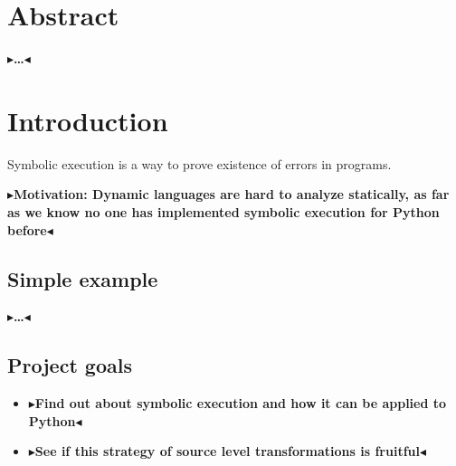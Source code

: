 \documentclass[11pt]{report}
\newcommand{\todo}[1]{{\color[rgb]{.5,0,0}\textbf{$\blacktriangleright$#1$\blacktriangleleft$}}}
\begin{document}

\pagestyle{empty} 
\vspace*{\fill}
\clearpage


\pagestyle{plain}
\chapter*{Abstract}
\todo{\dots}

\setcounter{tocdepth}{1}
\tableofcontents
{}
\setcounter{secnumdepth}{2}


\chapter{Introduction}
\label{ch:intro}

Symbolic execution is a way to prove existence of errors in programs.

\todo{Motivation: Dynamic languages are hard to analyze statically, as
  far as we know no one has implemented symbolic execution for Python
  before}

\section{Simple example}
\todo{\dots}

\section{Project goals}
\begin{itemize}
  \item \todo{Find out about symbolic execution and how it can be
    applied to Python}
  \item \todo{See if this strategy of source level transformations is
    fruitful}
\end{itemize}
\end{document}
